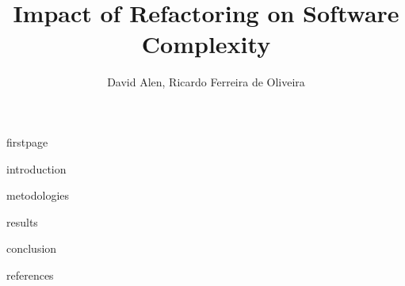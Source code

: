 \documentclass[12pt]{article}
\title{Impact of Refactoring on Software Complexity}
\author{David Alen\inst{1}, Ricardo Ferreira de Oliveira\inst{1}}
\begin{document}
{firstpage}

{introduction}

{metodologies}

{results}

{conclusion}

{references}
\end{document}
